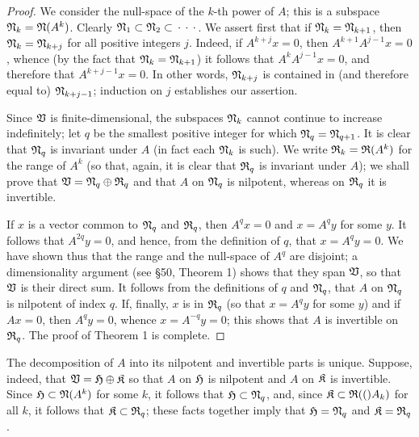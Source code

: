 \begin{proof}
    We consider the null-space of the \(k\)-th power of \(A\); this is a
    subspace \(\frak{N}_k = \frak{N}(A^k)\). Clearly \(\frak{N}_1\subset
    \frak{N}_2 \subset \,\cdot\,\cdot\,\cdot\,\). We assert first that if \(\frak{N}_k =
    \frak{N}_{k+1}\), then \(\frak{N}_{k} = \frak{N}_{k+j}\) for all positive
    integers \(j\). Indeed, if \(A^{k+j}x = 0\), then \(A^{k+1} A^{j-1}x = 0\),
    whence (by the fact that \(\frak{N}_k = \frak{N}_{k+1}\)) it follows that
    \(A^k A^{j-1}x = 0\), and therefore that \(A^{k+j-1}x = 0\). In other words,
    \(\frak{N}_{k+j}\) is contained in (and therefore equal to)
    \(\frak{N}_{k+j-1}\); induction on \(j\) establishes our assertion.

    Since \(\mathfrak{V}\) is finite-dimensional, the subspaces \(\frak{N}_k\) cannot
    continue to increase indefinitely; let \(q\) be the smallest positive
    integer for which \(\frak{N}_q = \frak{N}_{q+1}\). It is clear that
    \(\frak{N}_q\) is invariant under \(A\) (in fact each \(\frak{N}_k\) is
    such). We write \(\frak{R}_k = \frak{R}(A^k)\) for the range of \(A^k\) (so
    that, again, it is clear that \(\frak{R}_q\) is invariant under \(A\)); we
    shall prove that \(\mathfrak{V} = \frak{N}_q \oplus \frak{R}_q\) and that \(A\) on
    \(\frak{N}_q\) is nilpotent, whereas on \(\frak{R}_q\) it is invertible.
    
    If \(x\) is a vector common to \(\frak{N}_q\) and \(\frak{R}_q\), then \(A^q
    x = 0\) and \(x = A^q y\) for some \(y\). It follows that \(A^{2q}y = 0\),
    and hence, from the definition of \(q\), that \(x= A^{q}y = 0\). We have
    shown thus that the range and the null-space of \(A^q\) are disjoint; a
    dimensionality argument (see §50, Theorem 1) shows that they span
    \(\mathfrak{V}\), so that \(\mathfrak{V}\) is their direct sum. It follows from the
    definitions of \(q\) and \(\frak{N}_q\), that \(A\) on \(\frak{N}_q\) is
    nilpotent of index \(q\). If, finally, \(x\) is in \(\frak{R}_q\) (so that
    \(x = A^qy\) for some \(y\)) and if \(Ax = 0\), then \(A^qy = 0\), whence
    \(x= A^{-q}y = 0\); this shows that \(A\) is invertible on \(\frak{R}_q\).
    The proof of Theorem 1 is complete.
\end{proof}

The decomposition of \(A\) into its nilpotent and invertible parts is unique.
Suppose, indeed, that \(\mathfrak{V} = \frak{H} \oplus \frak{K}\) so that \(A\) on
\(\frak{H}\) is nilpotent and \(A\) on \(\frak{K}\) is invertible. Since
\(\frak{H} \subset \frak{N}(A^k)\) for some \(k\), it follows that \(\frak{H}
\subset \frak{N}_q\), and, since \(\frak{K} \subset \frak{R}(()A_k)\) for all \(k\),
it follows that \(\frak{K} \subset \frak{R}_q\); these facts together imply that
\(\frak{H} = \frak{N}_q\) and \(\frak{K} = \frak{R}_q\).


